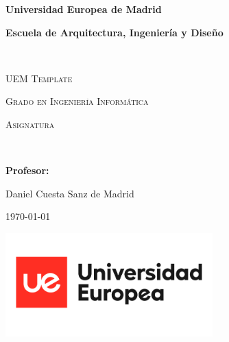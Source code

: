 
\begin{titlepage}
\centering
{\bfseries\LARGE Universidad Europea de Madrid \par}
\vspace{0cm}
{\bfseries\LARGE Escuela de Arquitectura, Ingeniería y Diseño \par}
\vfill
\noindent\hrulefill \\
{\scshape\Huge UEM Template \par} %
\vspace{0.5cm}
{\scshape\Large Grado en Ingeniería Informática \par}
\vspace{0.5cm}
{\scshape\Large Asignatura \par} %
\noindent\hrulefill \\
\vfill
{\bfseries\Large Profesor: \par}
\vfill
{\Large Daniel Cuesta Sanz de Madrid}
\vfill
{\large\today \par} %

{\includegraphics[height=4cm]{logo.png}}
\end{titlepage}
\setcounter{page}{1}
\newpage